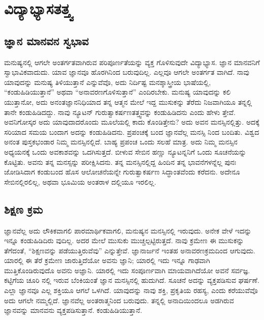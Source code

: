 
\chapter{ವಿದ್ಯಾಭ್ಯಾಸತತ್ತ್ವ}

\section{ಜ್ಞಾನ ಮಾನವನ ಸ್ವಭಾವ}

ಮನುಷ್ಯನಲ್ಲಿ ಆಗಲೇ ಅಂತರ್ಗತವಾಗಿರುವ ಪರಿಪೂರ್ಣತೆಯನ್ನು ವ್ಯಕ್ತ ಗೊಳಿಸುವುದೇ ವಿದ್ಯಾಭ್ಯಾಸ. ಜ್ಞಾನ ಮಾನವನಿಗೆ ಸ್ವಾಭಾವಿಕವಾದುದು. ಯಾವ ಜ್ಞಾನವೂ ಹೊರಗಿನಿಂದ ಬರುವುದಿಲ್ಲ. ಎಲ್ಲವೂ ಆಗಲೇ ಅಂತರ್ಗತ ವಾಗಿದೆ. ನಾವು ಯಾವುದನ್ನು ಮನುಷ್ಯ ತಿಳಿಯುತ್ತಾನೆ ಎನ್ನುವೆವೊ, ಅದು ನಿರ್ದಿಷ್ಟ ಮನಶ್ಶಾಸ್ತ್ರೀಯ ಭಾಷೆಯಲ್ಲಿ, “ಕಂಡುಹಿಡಿಯುತ್ತಾನೆ” ಅಥವಾ “ಅನಾವರಣಗೊಳಿಸುತ್ತಾನೆ” ಎಂದಿರಬೇಕು. ಮನುಷ್ಯ ಯಾವುದನ್ನು ಕಲಿ ಯುತ್ತಾನೋ, ಅದು ಅನಂತಜ್ಞಾನನಿಧಿಯಾದ ತನ್ನ ಆತ್ಮನ ಮೇಲೆ ಇದ್ದ ಮುಸುಕನ್ನು ತೆರೆದು ನಿಜವಾಗಿಯೂ ತನ್ನಲ್ಲಿ ತಾನೇ ಕಂಡುಹಿಡಿದದ್ದು. ನಾವು ನ್ಯೂಟನ್ ಗುರುತ್ವಾಕರ್ಷಣತತ್ತ್ವವನ್ನು ಕಂಡುಹಿಡಿದನು ಎಂದು ಹೇಳು ತ್ತೇವೆ. ಅವನಿಗೋಸ್ಕರ ಅದು ಯಾವುದಾದರೊಂದು ಮೂಲೆಯಲ್ಲಿ ಕಾದು ಕೊಂಡಿತ್ತೇನು? ಅದು ಅವನ ಮನಸ್ಸಿನಲ್ಲಿತ್ತು. ಅದಕ್ಕೆ ಸರಿಯಾದ ಸಮಯ ಬಂದಾಗ ಅದನ್ನು ಕಂಡುಹಿಡಿದನು. ಪ್ರಪಂಚಕ್ಕೆ ಬಂದ ಜ್ಞಾನವೆಲ್ಲ ಮನಸ್ಸಿ ನಿಂದ ಬಂದಿತು. ವಿಶ್ವದ ಅನಂತ ಪುಸ್ತಕಭಂಡಾರ ನಿಮ್ಮ ಮನಸ್ಸಿನಲ್ಲಿದೆ. ಬಾಹ್ಯ ಪ್ರಪಂಚ ಒಂದು ಸಲಹೆ ಮಾತ್ರ. ಅದು ನಿಮ್ಮ ಮನಸ್ಸಿನ ಅಧ್ಯಯನಕ್ಕೆ ಒಂದು ಅವಕಾಶವನ್ನು ಒದಗಿಸುತ್ತದೆ. ಬೀಳುವ ಸೇಬಿನ ಹಣ್ಣು ನ್ಯೂಟನ್ನನಿಗೆ ಒಂದು ಸೂಚನೆಯನ್ನು ಕೊಟ್ಟಿತು. ಅವನು ತನ್ನ ಮನಸ್ಸನ್ನು ಪರೀಕ್ಷಿಸಿದನು. ತನ್ನ ಮನಸ್ಸಿನಲ್ಲಿದ್ದ ಹಿಂದಿನ ತನ್ನ ಭಾವನೆಗಳನ್ನೆಲ್ಲ ಪುನಃ ಜೋಡಿಸಿದಾಗ ಕಂಡುಬಂದ ಹೊಸ ಆಲೋಚನೆಯನ್ನೇ ಗುರುತ್ವಾಕರ್ಷಣ ಸಿದ್ಧಾಂತವೆಂದು ಕರೆದನು. ಅದೇನೂ ಸೇಬಿನಲ್ಲಿರಲಿಲ್ಲ, ಅಥವಾ ಭೂಮಿಯ ಅಂತರಾಳ ದಲ್ಲಿಯೂ ಇರಲಿಲ್ಲ.


\section{ಶಿಕ್ಷಣ ಕ್ರಮ}

ಜ್ಞಾನವೆಲ್ಲ ಅದು ಲೌಕಿಕವಾಗಲಿ ಪಾರಮಾರ್ಥಿಕವಾಗಲಿ, ಮನುಷ್ಯನ ಮನಸ್ಸಿನಲ್ಲಿ ಇರುವುದು. ಅನೇಕ ವೇಳೆ ಇದನ್ನು ಇನ್ನೂ ಕಂಡುಹಿಡಿದಿರು ವುದಿಲ್ಲ. ಅದರ ಮೇಲೆ ಮುಸುಕು ಮುಚ್ಚಲ್ಪಟ್ಟಿರುತ್ತದೆ. ನಾವು ಕ್ರಮೇಣ ಈ ಮುಸುಕನ್ನು ತೆಗೆದಂತೆ, “ಶಿಕ್ಷಣವನ್ನು ಪಡೆಯುತ್ತಿರುವೆವು” ಎನ್ನುತ್ತೇವೆ. ಜ್ಞಾನಾರ್ಜನೆ ಇಂತಹ ಅನಾವರಣಕ್ರಮದಿಂದ ಆಗುವುದು. ಯಾರಲ್ಲಿ ಈ ತೆರೆ ಕ್ರಮೇಣ ಜಾರುತ್ತಿದೆಯೋ ಅವನು ಜ್ಞಾನಿ; ಯಾರಲ್ಲಿ ಇದು ಇನ್ನೂ ಗಾಢವಾಗಿ ಮುತ್ತಿಕೊಂಡಿರುವುದೊ ಅವನು ಅಜ್ಞಾನಿ. ಯಾರಲ್ಲಿ ಇದು ಸಂಪೂರ್ಣವಾಗಿ ಮಾಯವಾಗಿದೆಯೋ ಅವನೆ ಸರ್ವಜ್ಞ. ಕಟ್ಟಿಗೆಯ ಚೂರಿ ನಲ್ಲಿ ಇರುವ ಬೆಂಕಿಯಂತೆ ಜ್ಞಾನ ಮನಸ್ಸಿನಲ್ಲಿ ಹುದುಗಿದೆ. ಸೂಚನೆ ಅದನ್ನು ವ್ಯಕ್ತಪಡಿಸುವ ಘರ್ಷಣೆ. ಎಲ್ಲಾ ಜ್ಞಾನವೂ ಎಲ್ಲ ಶಕ್ತಿಯೂ ಆಗಲೆ ಒಳಗಿದೆ. ಯಾವುದನ್ನು ನಾವು ಶಕ್ತಿ, ಪ್ರಕೃತಿಯ ರಹಸ್ಯ, ಎಂದು ಕರೆಯುವೆವೊ ಅದು ಆಗಲೇ ನಮ್ಮಲ್ಲಿದೆ. ಜ್ಞಾನವೆಲ್ಲ ಅಂತರಾತ್ಮನಿಂದ ಬರುವುದು. ತನ್ನಲ್ಲಿ ಅನಾದಿಯಿಂದಲೂ ಅಡಗಿರುವ ಜ್ಞಾನವನ್ನು ಮಾನವನು ವ್ಯಕ್ತಪಡಿಸುತ್ತಾನೆ. ಕಂಡುಹಿಡಿಯುತ್ತಾನೆ.



